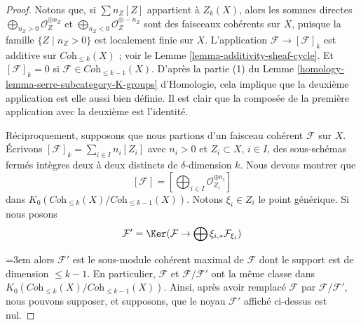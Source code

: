 \begin{proof}
Notons que, si $\sum n_Z[Z]$ appartient à $Z_k(X)$, alors
les sommes directes
$\bigoplus\nolimits_{n_Z > 0} \mathcal{O}_Z^{\oplus n_Z}$ et
$\bigoplus\nolimits_{n_Z < 0} \mathcal{O}_Z^{\oplus -n_Z}$
sont des faisceaux cohérents sur $X$, puisque la famille $\{Z \mid n_Z > 0\}$
est localement finie sur $X$.
L'application $\mathcal{F} \to [\mathcal{F}]_k$ est additive
sur $\textit{Coh}_{\leq k}(X)$ ; voir le
Lemme \ref{lemma-additivity-sheaf-cycle}. Et $[\mathcal{F}]_k = 0$
si $\mathcal{F} \in \textit{Coh}_{\leq k - 1}(X)$. D'après la partie (1)
du Lemme \ref{homology-lemma-serre-subcategory-K-groups} d'Homologie,
cela implique que la deuxième application est elle aussi bien définie.
Il est clair que la composée de la première application avec la deuxième
est l'identité.

\medskip\noindent
Réciproquement, supposons que nous partions d'un faisceau cohérent $\mathcal{F}$
sur $X$. Écrivons $[\mathcal{F}]_k = \sum_{i \in I} n_i[Z_i]$
avec $n_i > 0$ et $Z_i \subset X$, $i \in I$,
des sous-schémas fermés intègres deux à deux distincts de $\delta$-dimension $k$.
Nous devons montrer que
$$
[\mathcal{F}] = [\bigoplus\nolimits_{i \in I} \mathcal{O}_{Z_i}^{\oplus n_i}]
$$
dans $K_0(\textit{Coh}_{\leq k}(X)/\textit{Coh}_{\leq k - 1}(X))$.
Notons $\xi_i \in Z_i$ le point générique.
Si nous posons
$$
\mathcal{F}' = \Ker(\mathcal{F} \to \bigoplus \xi_{i, *}\mathcal{F}_{\xi_i})
$$
{\emergencystretch=3em alors $\mathcal{F}'$ est le sous-module cohérent maximal de $\mathcal{F}$
dont le support est de dimension $\leq k - 1$. En particulier, $\mathcal{F}$
et $\mathcal{F}/\mathcal{F}'$ ont la même classe dans
$K_0(\textit{Coh}_{\leq k}(X)/\textit{Coh}_{\leq k - 1}(X))$.
Ainsi, après avoir remplacé $\mathcal{F}$ par $\mathcal{F}/\mathcal{F}'$,
nous pouvons supposer, et supposons, que le noyau $\mathcal{F}'$ affiché
ci-dessus est nul.\par}


\end{proof}
